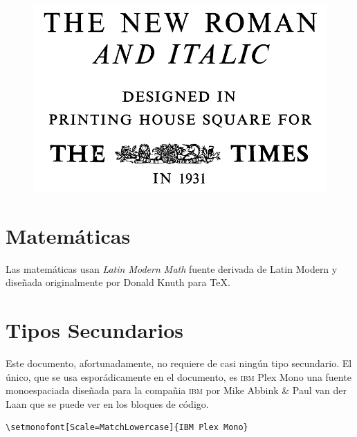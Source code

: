 \begin{figure}
\includegraphics[width=.75\linewidth]{pictures/times.png}
\end{figure}

\section*{Matemáticas}%
\label{sec:Matemáticas}
Las matemáticas usan \emph{Latin Modern Math} fuente derivada de Latin Modern y diseñada originalmente
por Donald Knuth para \TeX{}.

\section*{Tipos Secundarios}%
\label{sec:Tipos Secundarios}

Este documento, afortunadamente, no requiere de casi ningún tipo secundario. El único, que
se usa esporádicamente en el documento, es \textsc{ibm} Plex Mono una fuente monoespaciada
diseñada para la compañia \textsc{ibm} por Mike Ab­bink \& Paul van der Laan
que se puede ver en los bloques de código.
\begin{small}
\begin{verbatim}
\setmonofont[Scale=MatchLowercase]{IBM Plex Mono}
\end{verbatim}	
\end{small}




